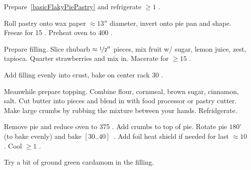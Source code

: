 \begin{preparation}
\item Prepare~\ref{basicFlakyPiePastry}  and refrigerate $\geq 1$ \hour.

\item Roll pastry onto wax paper $\approx 13''$ diameter, invert onto pie pan and shape.
	Freeze for 15 \minute.
	Preheat oven to $400$ \Fahrenheit.

\item Prepare filling.
	Slice rhubarb $\approx \nicefrac{1}{2}''$ pieces, mix fruit w/ sugar, lemon juice, zest, tapioca.
	Quarter strawberries and mix in.
	Macerate for $\geq 15$ \minute.

\item Add filling evenly into crust, bake on center rack 30 \minute.

\item Meanwhile prepare topping.
	Combine flour, cornmeal, brown sugar, cinnamon, salt.
	Cut butter into pieces and blend in with food processor or pastry cutter.
	Make large crumbs by rubbing the mixture between your hands.
	Refridgerate.

\item Remove pie and reduce oven to 375 \Fahrenheit.
	Add crumbs to top of pie.
	Rotate pie $180^\circ$ (to bake evenly) and bake $[30..40]$~\minute.
	Add foil heat shield if needed for last $\approx 10$ \minute.
	Cool $\geq 1$ \hour.
\end{preparation}


\begin{variation}
\item Try a bit of ground green cardamom in the filling.
\end{variation}


\recipeend%
